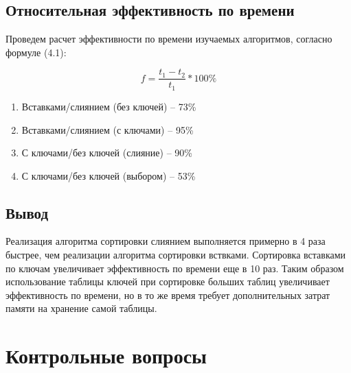 \section{Относительная эффективность по времени}

Проведем расчет эффективности по времени изучаемых алгоритмов, согласно формуле (4.1):

\begin{equation}
	f = \frac{t_1 - t_2}{t_1} * 100\%
\end{equation}

\begin{enumerate}
	\item Вставками/слиянием (без ключей) -- 73\%
	\item Вставками/слиянием (с ключами) -- 95\%
	\item С ключами/без ключей (слияние) -- 90\%
	\item С ключами/без ключей (выбором) -- 53\%
\end{enumerate}

\section{Вывод}

Реализация алгоритма сортировки слиянием выполняется примерно в 4 раза быстрее, чем реализации алгоритма сортировки вствками. Сортировка вставками по ключам увеличивает эффективность по времени еще в 10 раз. Таким образом использование таблицы ключей при сортировке больших таблиц увеличивает эффективность по времени, но в то же время требует дополнительных затрат памяти на хранение самой таблицы.

\chapter{Контрольные вопросы}

